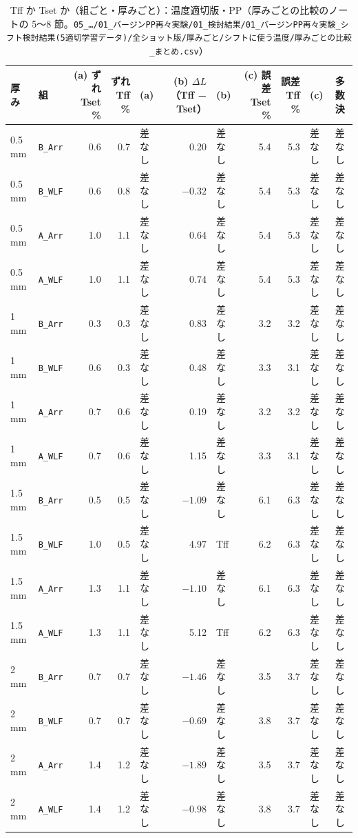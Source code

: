 \documentclass[paper=a4paper,landscape,fontsize=10pt,line_length=62zw,number_of_lines=34]{jlreq}
\begin{document}
\begin{table}[H]\centering\footnotesize
\caption{Tff か Tset か（組ごと・厚みごと）：温度適切版・PP（厚みごとの比較のノートの 5〜8 節。\texttt{05\_\allowbreak{}…/\allowbreak{}01\_\allowbreak{}バージンPP再々実験/\allowbreak{}01\_\allowbreak{}検討結果/\allowbreak{}01\_\allowbreak{}バージンPP再々実験\_\allowbreak{}シフト検討結果(5適切学習データ)/\allowbreak{}全ショット版/\allowbreak{}厚みごと/\allowbreak{}シフトに使う温度/\allowbreak{}厚みごとの比較\_\allowbreak{}まとめ.csv}）}
\begin{tabular}{llrrlrlrrll}
\toprule
厚み & 組 & (a) ずれ Tset \% & ずれ Tff \% & (a) & (b) $\Delta L$（Tff − Tset） & (b) & (c) 誤差 Tset \% & 誤差 Tff \% & (c) & 多数決 \\
\midrule
0.5 mm & \texttt{B\_\allowbreak{}Arr} & 0.6 & 0.7 & 差なし & 0.20 & 差なし & 5.4 & 5.3 & 差なし & 差なし \\
0.5 mm & \texttt{B\_\allowbreak{}WLF} & 0.6 & 0.8 & 差なし & $-0.32$ & 差なし & 5.4 & 5.3 & 差なし & 差なし \\
0.5 mm & \texttt{A\_\allowbreak{}Arr} & 1.0 & 1.1 & 差なし & 0.64 & 差なし & 5.4 & 5.3 & 差なし & 差なし \\
0.5 mm & \texttt{A\_\allowbreak{}WLF} & 1.0 & 1.1 & 差なし & 0.74 & 差なし & 5.4 & 5.3 & 差なし & 差なし \\
1 mm & \texttt{B\_\allowbreak{}Arr} & 0.3 & 0.3 & 差なし & 0.83 & 差なし & 3.2 & 3.2 & 差なし & 差なし \\
1 mm & \texttt{B\_\allowbreak{}WLF} & 0.6 & 0.3 & 差なし & 0.48 & 差なし & 3.3 & 3.1 & 差なし & 差なし \\
1 mm & \texttt{A\_\allowbreak{}Arr} & 0.7 & 0.6 & 差なし & 0.19 & 差なし & 3.2 & 3.2 & 差なし & 差なし \\
1 mm & \texttt{A\_\allowbreak{}WLF} & 0.7 & 0.6 & 差なし & 1.15 & 差なし & 3.3 & 3.1 & 差なし & 差なし \\
1.5 mm & \texttt{B\_\allowbreak{}Arr} & 0.5 & 0.5 & 差なし & $-1.09$ & 差なし & 6.1 & 6.3 & 差なし & 差なし \\
1.5 mm & \texttt{B\_\allowbreak{}WLF} & 1.0 & 0.5 & 差なし & 4.97 & Tff & 6.2 & 6.3 & 差なし & 差なし \\
1.5 mm & \texttt{A\_\allowbreak{}Arr} & 1.3 & 1.1 & 差なし & $-1.10$ & 差なし & 6.1 & 6.3 & 差なし & 差なし \\
1.5 mm & \texttt{A\_\allowbreak{}WLF} & 1.3 & 1.1 & 差なし & 5.12 & Tff & 6.2 & 6.3 & 差なし & 差なし \\
2 mm & \texttt{B\_\allowbreak{}Arr} & 0.7 & 0.7 & 差なし & $-1.46$ & 差なし & 3.5 & 3.7 & 差なし & 差なし \\
2 mm & \texttt{B\_\allowbreak{}WLF} & 0.7 & 0.7 & 差なし & $-0.69$ & 差なし & 3.8 & 3.7 & 差なし & 差なし \\
2 mm & \texttt{A\_\allowbreak{}Arr} & 1.4 & 1.2 & 差なし & $-1.89$ & 差なし & 3.5 & 3.7 & 差なし & 差なし \\
2 mm & \texttt{A\_\allowbreak{}WLF} & 1.4 & 1.2 & 差なし & $-0.98$ & 差なし & 3.8 & 3.7 & 差なし & 差なし \\
\bottomrule
\end{tabular}
\end{table}
\clearpage
\end{document}
